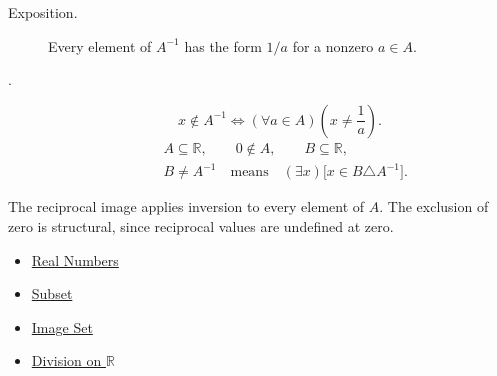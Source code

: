 \begin{remark*}
\begin{description}
  \item[Exposition.]
Every element of $A^{-1}$ has the form $1/a$ for a nonzero $a\in A$.


  \item[.]
  \[
x\notin A^{-1}\Longleftrightarrow(\forall a\in A)\left(x\neq\frac{1}{a}\right).
\]
\[
\begin{aligned}
&A\subseteq\mathbb{R},\qquad 0\notin A,\qquad B\subseteq\mathbb{R},\\
&B\ne A^{-1}
\quad\text{means}\quad
(\exists x)\bigl[x\in B\triangle A^{-1}\bigr].
\end{aligned}
\]
\end{description}
\end{remark*}

\begin{remark*}[Interpretation]
The reciprocal image applies inversion to every element of $A$. The exclusion
of zero is structural, since reciprocal values are undefined at zero.
\end{remark*}

\begin{dependencies}
\begin{itemize}
  \item \hyperref[def:reals]{Real Numbers}
  \item \hyperref[def:subset]{Subset}
  \item \hyperref[def:image-set]{Image Set}
  \item \hyperref[def:division-on-r]{Division on $\mathbb{R}$}
\end{itemize}
\end{dependencies}


